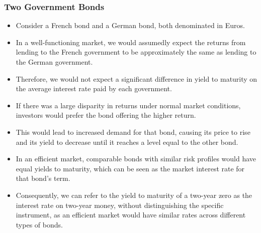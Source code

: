 \subsubsection*{Two Government Bonds}
\begin{itemize}
    \item Consider a French bond and a German bond, both denominated in Euros.
    \item In a well-functioning market, we would assumedly expect the returns from lending to the French government to be approximately the same as lending to the German government.
    \item Therefore, we would not expect a significant difference in yield to maturity on the average interest rate paid by each government.
    \item If there was a large disparity in returns under normal market conditions, investors would prefer the bond offering the higher return.
    \item This would lead to increased demand for that bond, causing its price to rise and its yield to decrease until it reaches a level equal to the other bond.
    \item In an efficient market, comparable bonds with similar risk profiles would have equal yields to maturity, which can be seen as the market interest rate for that bond's term. 
    \item Consequently, we can refer to the yield to maturity of a two-year zero as the interest rate on two-year money, without distinguishing the specific instrument, as an efficient market would have similar rates across different types of bonds.
\end{itemize}

